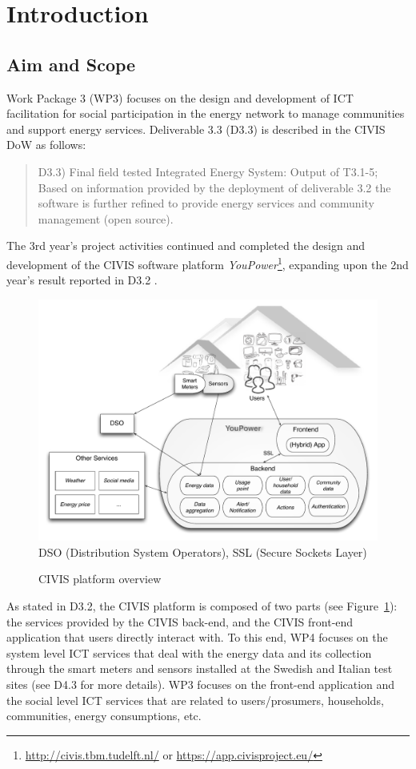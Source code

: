 
\section{Introduction}

\subsection{Aim and Scope} 

Work Package 3 (WP3) focuses on the design and development of ICT facilitation for social participation in the energy network to manage communities and support energy services. Deliverable 3.3 (D3.3) is described in the CIVIS DoW as follows: 

\begin{quote}
D3.3) Final field tested Integrated Energy System: Output of T3.1-5; Based on information provided by the deployment of deliverable 3.2 the software is further refined to provide energy services and community management (open source). 
\end{quote}


The 3rd year's project activities continued and completed  the design and development of the CIVIS software platform \textit{YouPower}\footnote{\url{http://civis.tbm.tudelft.nl/} or \url{https://app.civisproject.eu/}}, 
expanding upon the 2nd year's result reported in D3.2 \citep{Huang2015c}. 
%
\begin{figure}[h!]
\begin{center}\footnotesize
	\includegraphics[width=.85\textwidth]{img/civis_platform_overview.pdf}\\
	DSO (Distribution System Operators),  SSL (Secure Sockets Layer)
	\caption{CIVIS platform overview}\label{fig:platform}
\end{center}
\end{figure}
% 
As stated in D3.2, the CIVIS platform is composed of two parts (see Figure~\ref{fig:platform}): 
the services provided by the CIVIS back-end, and the CIVIS front-end application that users directly interact with. 
%
To this end, WP4 focuses on the system level ICT services that deal with the energy data and its collection through the smart meters and sensors installed at the Swedish and Italian test sites (see D4.3 for more details). 
% 
WP3 focuses on the front-end application and the social level ICT services that are related to users/prosumers, households, communities, energy consumptions, etc. 

